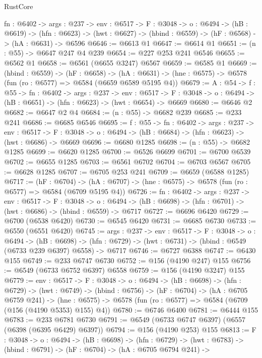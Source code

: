 \begin{lexlean}{RustCore}
\begin{coremodule}
  {fn : @6402} ->
  {args : @237} ->
  {env : @6517} ->
  {F : @3048} ->
  {o : @6494} ->
  (hB : @6619) ->
  (hfn : @6623) -> (hwt : @6627) -> (hbind : @6559) -> (hF : @6568) -> (hA : @6631) -> @6596
@6646 := @6613 @1
@6647 := @6614 @1
@6651 := (n : @55) -> @6647 @247 @4 @239
@6654 := @227 @253 @241 @6546
@6655 := @6562 @1
@6658 := @6561 (@6655 @3247) @6567
@6659 := @6585 @1
@6669 := (hbind : @6559) ->
  (hF : @6658) ->
  (hA : @6631) -> (hne : @6575) -> @6578 (fun (ro : @6577) => @6584 (@6659 @6589 @5195 @4))
@6679 := {A : @54} ->
  {f : @55} ->
  {fn : @6402} ->
  {args : @237} ->
  {env : @6517} ->
  {F : @3048} -> {o : @6494} -> (hB : @6651) -> (hfn : @6623) -> (hwt : @6654) -> @6669
@6680 := @6646 @2
@6682 := @6647 @2 @4
@6684 := (n : @55) -> @6682 @239
@6685 := @233 @241
@6686 := @6685 @6546
@6695 := {f : @55} ->
  {fn : @6402} ->
  {args : @237} ->
  {env : @6517} ->
  {F : @3048} -> {o : @6494} -> (hB : @6684) -> (hfn : @6623) -> (hwt : @6686) -> @6669
@6696 := @6680 @1285
@6698 := (n : @55) -> @6682 @1285
@6699 := @6620 @1285
@6700 := @6526 @6699
@6701 := @6700 @6539
@6702 := @6655 @1285
@6703 := @6561 @6702
@6704 := @6703 @6567
@6705 := @6628 @1285
@6707 := @6705 @253 @241
@6709 := @6659 (@6588 @1285)
@6717 := (hF : @6704) ->
  (hA : @6707) -> (hne : @6575) -> @6578 (fun (ro : @6577) => @6584 (@6709 @5195 @4))
@6726 := {fn : @6402} ->
  {args : @237} ->
  {env : @6517} ->
  {F : @3048} ->
  {o : @6494} -> (hB : @6698) -> (hfn : @6701) -> (hwt : @6686) -> (hbind : @6559) -> @6717
@6727 := @6696 @6420
@6729 := @6700 (@6538 @6420)
@6730 := @6545 @6420
@6731 := @6685 @6730
@6733 := @6550 (@6551 @6420)
@6745 := {args : @237} ->
  {env : @6517} ->
  {F : @3048} ->
  {o : @6494} ->
  (hB : @6698) ->
  (hfn : @6729) -> (hwt : @6731) -> (hbind : @6549 (@6733 @239 @6397) @6558) -> @6717
@6746 := @6727 @6388
@6747 := @6430 @155
@6749 := @233 @6747 @6730
@6752 := @156 (@4190 @247) @155
@6756 := @6549 (@6733 @6752 @6397) @6558
@6759 := @156 (@4190 @3247) @155
@6779 := {env : @6517} ->
  {F : @3048} ->
  {o : @6494} ->
  (hB : @6698) ->
  (hfn : @6729) ->
  (hwt : @6749) ->
  (hbind : @6756) ->
  (hF : @6704) ->
  (hA : @6705 @6759 @241) ->
  (hne : @6575) -> @6578 (fun (ro : @6577) => @6584 (@6709 (@156 (@4190 @5353) @155) @4))
@6780 := @6746 @6400
@6781 := @6444 @155
@6783 := @233 @6781 @6730
@6791 := @6549 (@6733 @6747 @6397) (@6557 (@6398 (@6395 @6429) @6397))
@6794 := @156 (@4190 @253) @155
@6813 := {F : @3048} ->
  {o : @6494} ->
  (hB : @6698) ->
  (hfn : @6729) ->
  (hwt : @6783) ->
  (hbind : @6791) ->
  (hF : @6704) ->
  (hA : @6705 @6794 @241) ->

\end{coremodule}
\end{lexlean}
